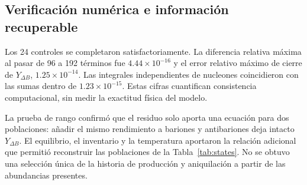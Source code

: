 \subsection{Verificación numérica e información recuperable}
Los 24 controles se completaron satisfactoriamente. La diferencia relativa máxima al pasar de 96 a 192 términos fue $4.44\times10^{-16}$ y el error relativo máximo de cierre de $Y_{\Delta B}$, $1.25\times10^{-14}$. Las integrales independientes de nucleones coincidieron con las sumas dentro de $1.23\times10^{-15}$. Estas cifras cuantifican consistencia computacional, sin medir la exactitud física del modelo.

La prueba de rango confirmó que el residuo solo aporta una ecuación para dos poblaciones: añadir el mismo rendimiento a bariones y antibariones deja intacto $Y_{\Delta B}$. El equilibrio, el inventario y la temperatura aportaron la relación adicional que permitió reconstruir las poblaciones de la Tabla~\ref{tab:states}. No se obtuvo una selección única de la historia de producción y aniquilación a partir de las abundancias presentes.
